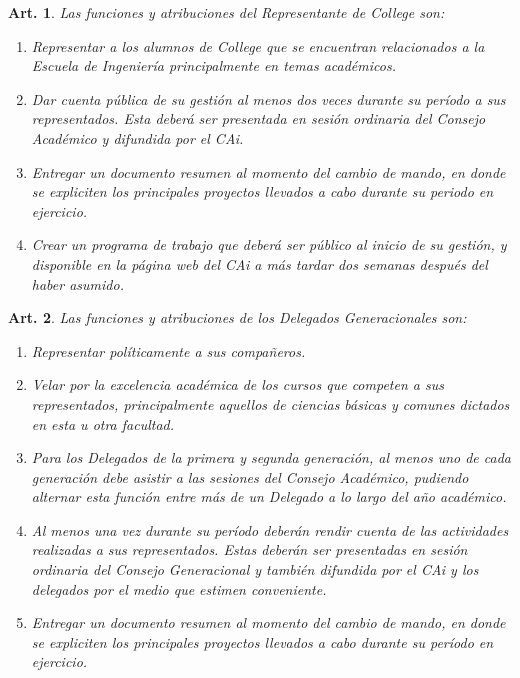 \documentclass[letterpaper,11pt]{article}
\theoremstyle{plain}
\newtheorem{art}{Art.} %
\begin{document}
		\begin{art}\label{representanteCollege}
			Las funciones y atribuciones del Representante de College son:
			\begin{enumerate}
				\item Representar a los alumnos de College que se encuentran relacionados a la Escuela de Ingeniería principalmente en temas académicos.
				\item Dar cuenta pública de su gestión al menos dos veces durante su período a sus representados. Esta deberá ser presentada en sesión ordinaria del Consejo Académico y difundida por el CAi.
				\item Entregar un documento resumen al momento del cambio de mando, en donde se expliciten los principales proyectos llevados a cabo durante su periodo en ejercicio. 
				\item Crear un programa de trabajo que deberá ser público al inicio de su gestión, y disponible en la página web del CAi a más tardar dos semanas después del haber asumido.
			\end{enumerate}
		\end{art}

		\begin{art}\label{funcionesDelegadosGeneracionales}
			Las funciones y atribuciones de los Delegados Generacionales son:
			\begin{enumerate}
				\item Representar políticamente a sus compañeros.
				\item Velar por la excelencia académica de los cursos que competen a sus representados, principalmente aquellos de ciencias básicas y comunes dictados en esta u otra facultad.
				\item Para los Delegados de la primera y segunda generación, al menos uno de cada generación debe asistir a las sesiones del Consejo Académico, pudiendo alternar esta función entre más de un Delegado a lo largo del año académico.
				\item \label{cuentaPublica} Al menos una vez durante su período deberán rendir cuenta de las actividades realizadas a sus representados. Estas deberán ser presentadas en sesión ordinaria del Consejo Generacional y también difundida por el CAi  y los delegados por el medio que estimen conveniente.
				\item Entregar un documento resumen al momento del cambio de mando, en donde se expliciten los principales proyectos llevados a cabo durante su período en ejercicio.
			\end{enumerate}
		\end{art}
\end{document}
